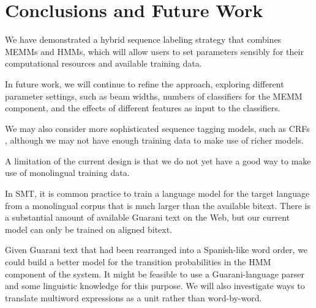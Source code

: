 \section{Conclusions and Future Work}

We have demonstrated a hybrid sequence labeling strategy
that combines MEMMs and HMMs, which will allow users to set parameters sensibly
for their computational resources and available training data.

In future work, we will continue to refine the approach, exploring different
parameter settings, such as beam widths, numbers of classifiers for the MEMM
component, and the effects of different features as input to the classifiers.

We may also consider more sophisticated sequence tagging models, such as CRFs
\cite{DBLP:conf/icml/LaffertyMP01}, although we may not have enough training
data to make use of richer models.

A limitation of the current design is that we do not yet have a good way to
make use of monolingual training data.

In SMT, it is common practice to train a
language model for the target language from a monolingual corpus that is much
larger than the available bitext. There is a substantial amount of available
Guarani text on the Web, but our current
model can only be trained on aligned bitext.

Given Guarani text that had been rearranged into a Spanish-like word order, we
could build a better model for the transition probabilities in the HMM
component of the system.
It might be feasible to use a Guarani-language parser and some linguistic
knowledge for this purpose.
We will also investigate ways to translate multiword expressions as a unit
rather than word-by-word.
